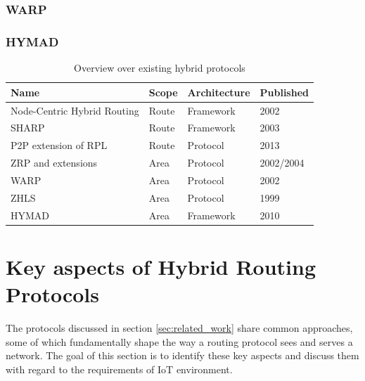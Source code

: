 \documentclass[a4paper,10pt]{scrartcl}
\begin{document}
\subsubsection{\gls{WARP}}
\label{subsec:sharp}

\subsubsection{\gls{HYMAD}}
\label{subsec:sharp}


\begin{table}[t]
    \begin{tabular}{p{}|l|l|l}
        Name & Scope & Architecture & Published \\
        \hline
        Node-Centric Hybrid Routing \cite{Roy_nodecentric} & Route & Framework & 2002 \\
        \gls{SHARP}\cite{SHARP} & Route & Framework & 2003 \\ %
        P2P extension\cite{RFC-6997} of RPL\cite{RFC-6550} & Route & Protocol & 2013\\
        \gls{ZRP} \cite{ZRP-Draft} and extensions \cite{TZRP} \cite{IZR} & Area & Protocol & 2002/2004\\
        \gls{WARP}\cite{WARP} & Area & Protocol & 2002\\
        \gls{ZHLS}\cite{ZHLS} & Area & Protocol & 1999\\
        \gls{HYMAD}\cite{HYMAD} & Area & Framework & 2010\\ %
    \end{tabular}
    \caption{Overview over existing hybrid protocols}
    \label{fig:overview}
\end{table}

\section{Key aspects of Hybrid Routing Protocols}
\label{sec:key_aspects}
The protocols discussed in section \ref{sec:related_work} share common approaches, some of which fundamentally shape the way a routing protocol sees and serves a network. The goal of this section is to identify these key aspects and discuss them with regard to the requirements of IoT environment.
\end{document}
